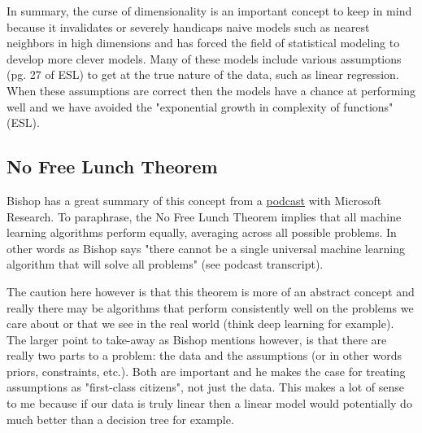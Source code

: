 In summary, the curse of dimensionality is an important concept to keep in mind because it invalidates or severely handicaps naive models such as nearest neighbors in high dimensions and has forced the field of statistical modeling to develop more clever models. Many of these models include various assumptions (pg. 27 of ESL) to get at the true nature of the data, such as linear regression. When these assumptions are correct then the models have a chance at performing well and we have avoided the "exponential growth in complexity of functions" (ESL).


\subsection{No Free Lunch Theorem}

Bishop has a great summary of this concept from a \href{https://www.microsoft.com/en-us/research/blog/machine-learning-and-the-learning-machine-with-dr-christopher-bishop/}{podcast} with Microsoft Research. To paraphrase, the No Free Lunch Theorem implies that all machine learning algorithms perform equally, averaging across all possible problems. In other words as Bishop says "there cannot be a single universal machine learning algorithm that will solve all problems" (see podcast transcript). 

The caution here however is that this theorem is more of an abstract concept and really there may be algorithms that perform consistently well on the problems we care about or that we see in the real world (think deep learning for example). The larger point to take-away as Bishop mentions however, is that there are really two parts to a problem: the data and the assumptions (or in other words priors, constraints, etc.). Both are important  and he makes the case for treating assumptions as "first-class citizens", not just the data. This makes a lot of sense to me because if our data is truly linear then a linear model would potentially do much better than a decision tree for example.


\newpage

